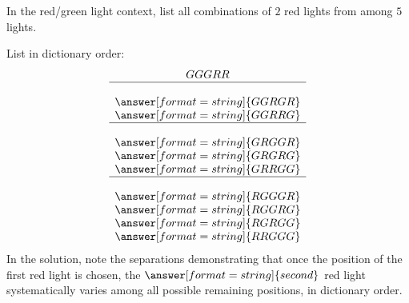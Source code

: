 \documentclass[nooutcomes]{ximera}
\begin{document}
\newpage
\begin{problem}
In the red/green light context, list all combinations of $2$ red lights from among $5$ lights.    
\begin{solution}
List in dictionary order: 
\[
\begin{array}{c}
GGGRR \\ \hline \\
\answer[format=string]{GGRGR} \\
\answer[format=string]{GGRRG} \\ \hline \\
\answer[format=string]{GRGGR} \\
\answer[format=string]{GRGRG} \\
\answer[format=string]{GRRGG} \\ \hline \\
\answer[format=string]{RGGGR} \\
\answer[format=string]{RGGRG} \\
\answer[format=string]{RGRGG} \\
\answer[format=string]{RRGGG}
\end{array}
\]
In the solution, note the separations demonstrating that once the position of the first red light is chosen, the $\answer[format=string]{second}$ red light systematically varies among all possible remaining positions, in dictionary order.  
\end{solution}
\end{problem}
\end{document}
